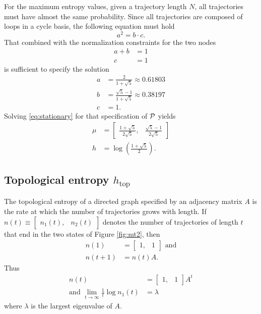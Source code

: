 \documentclass[12pt]{article} \usepackage{amsmath,amsfonts}
\newcommand{\htop}{{h_{\text{top}}}}
\newcommand{\T}{{\cal P}}
\begin{document}
For the maximum entropy values, given a trajectory length $N$, all
trajectories must have almost the same probability.  Since all
trajectories are composed of loops in a cycle basis, the following
equation must hold
\begin{equation}
  \label{eq:excycle}
  a^2 = b\cdot c.
\end{equation}
That combined with the normalization constraints for the two nodes
\begin{align*}
  a + b &= 1 \\
  c &= 1
\end{align*}
is sufficient to specify the solution
\begin{align*}
  a &= \frac{2}{1+\sqrt{5}} \approx          0.61803\\
  b &= \frac{\sqrt{5}-1}{1+\sqrt{5}} \approx 0.38197\\
  c &= 1.
\end{align*}
Solving \eqref{eq:stationary} for that specification of $\T$ yields
\begin{align*}
  \mu &=  \begin{bmatrix} \frac{1+\sqrt{5}}{2\sqrt{5}}, &
    \frac{\sqrt{5}-1}{2\sqrt{5}} \end{bmatrix} \\
  h &= \log\left(\frac{1+\sqrt{5}}{2}\right).
\end{align*}


\subsection{Topological entropy $\htop$}
\label{sec:htop}

The topological entropy of a directed graph specified by an adjacency
matrix $A$ is the rate at which the number of trajectories grows with
length.  If $n(t)\equiv\begin{bmatrix} n_1(t),&n_2(t)\end{bmatrix}$
denotes the number of trajectories of length $t$ that end in the two
states of Figure \ref{fig:mt2}, then
\begin{align*}
  n(1) &= \begin{bmatrix} 1,&1\end{bmatrix} \text{ and} \\
  n(t+1) &= n(t) A.
\end{align*}
Thus
\begin{align*}
  n(t) &= \begin{bmatrix} 1,&1\end{bmatrix} A^t \\
  \text{and }\lim_{t\rightarrow \infty} \frac{1}{t} \log n_1(t) &=
  \lambda
\end{align*}
where $\lambda$ is the largest eigenvalue of $A$.
\end{document}
